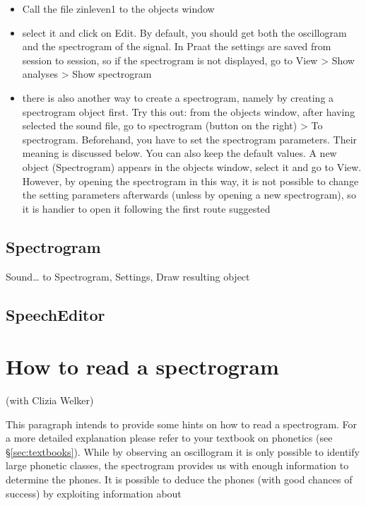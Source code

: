 \documentclass[
]{book}
\providecommand{\tightlist}{%
  \setlength{\itemsep}{0pt}\setlength{\parskip}{0pt}}
\begin{document}
\begin{itemize}
\tightlist
\item
  Call the file zinleven1 to the objects window
\item
  select it and click on Edit. By default, you should get both the oscillogram and the spectrogram of the signal. In Praat the settings are saved from session to session, so if the spectrogram is not displayed, go to View \textgreater{} Show analyses \textgreater{} Show spectrogram
\item
  there is also another way to create a spectrogram, namely by creating a spectrogram object first. Try this out: from the objects window, after having selected the sound file, go to spectrogram (button on the right) \textgreater{} To spectrogram. Beforehand, you have to set the spectrogram parameters. Their meaning is discussed below. You can also keep the default values. A new object (Spectrogram) appears in the objects window, select it and go to View. However, by opening the spectrogram in this way, it is not possible to change the setting parameters afterwards (unless by opening a new spectrogram), so it is handier to open it following the first route suggested
\end{itemize}

\subsection{Spectrogram}\label{spectrogram}

Sound\ldots{} to Spectrogram, Settings, Draw resulting object

\subsection{SpeechEditor}\label{speecheditor}

\section{How to read a spectrogram}\label{how-to-read-a-spectrogram}

(with Clizia Welker)

This paragraph intends to provide some hints on how to read a spectrogram. For a more detailed explanation please refer to your textbook on phonetics (see §\ref{sec:textbooks}).
While by observing an oscillogram it is only possible to identify large phonetic classes, the spectrogram provides us with enough information to determine the phones. It is possible to deduce the phones (with good chances of success) by exploiting information about
\end{document}
